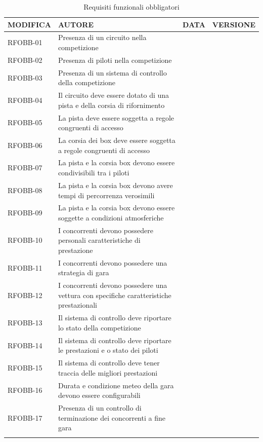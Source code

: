 \documentclass[a4paper,11pt, twoside]{book}
\begin{document}
  \begin{longtable}{|p{2cm}|p{2cm}|p{2cm}|p{2cm}|}
      \toprule
	\bfseries{MODIFICA} & \bfseries{AUTORE} & \bfseries{DATA} & \bfseries{VERSIONE} \\\hline
      \endfirsthead
      RFOBB-01 & Presenza di un circuito nella competizione \\\hline
      RFOBB-02 & Presenza di piloti nella competizione \\\hline 
      RFOBB-03 & Presenza di un sistema di controllo della competizione \\\hline
      RFOBB-04 & Il circuito deve essere dotato di una pista e della corsia di rifornimento \\\hline
      RFOBB-05 & La pista deve essere soggetta a regole congruenti di accesso \\\hline
      RFOBB-06 & La corsia dei box deve essere soggetta a regole congruenti di accesso \\\hline
      RFOBB-07 & La pista e la corsia box devono essere condivisibili tra i piloti \\\hline
      RFOBB-08 & La pista e la corsia box devono avere tempi di percorrenza verosimili \\\hline
      RFOBB-09 & La pista e la corsia box devono essere soggette a condizioni atmosferiche \\\hline
      RFOBB-10 & I concorrenti devono possedere personali caratteristiche di prestazione  \\\hline
      RFOBB-11 & I concorrenti devono possedere una strategia di gara  \\\hline
      RFOBB-12 & I concorrenti devono possedere una vettura con specifiche caratteristiche prestazionali  \\\hline
      RFOBB-13 & Il sistema di controllo deve riportare lo stato della competizione  \\\hline
      RFOBB-14 & Il sistema di controllo deve riportare le prestazioni e o stato dei piloti  \\\hline
      RFOBB-15 & Il sistema di controllo deve tener traccia delle migliori prestazioni  \\\hline
      RFOBB-16 & Durata e condizione meteo della gara devono essere configurabili  \\\hline
      RFOBB-17 & Presenza di un controllo di terminazione dei concorrenti a fine gara  \\\hline
      \caption{Requisiti funzionali obbligatori}
      \label{tbl:RequisitiFunzionaliObbligatori}
    \end{longtable}
    
\end{document}
